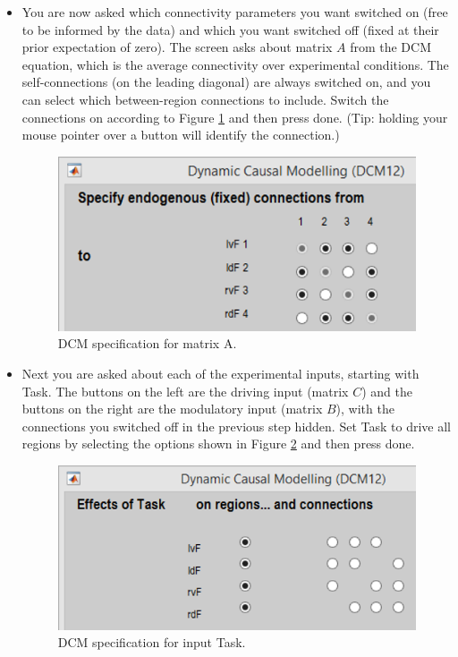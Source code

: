 \documentclass{article}
\begin{document}
\begin{itemize}
\item You are now asked which connectivity parameters you want switched on (free to be informed by the data) and which you want switched off (fixed at their prior expectation of zero). The screen asks about matrix \(A\) from the DCM equation, which is the average connectivity over experimental conditions. The self-connections (on the leading diagonal) are always switched on, and you can select which between-region connections to include. Switch the connections on according to Figure \ref{Fig_dcm_spec_A} and then press done. (Tip: holding your mouse pointer over a button will identify the connection.)

\begin{figure}[ht]
\begin{center}
\includegraphics{"Fig_dcm_spec_A"}
\caption{DCM specification for matrix A.\label{Fig_dcm_spec_A}}
\end{center}
\end{figure}

\item Next you are asked about each of the experimental inputs, starting with Task. The buttons on the left are the driving input (matrix \(C\)) and the buttons on the right are the modulatory input (matrix \(B\)), with the connections you switched off in the previous step hidden. Set Task to drive all regions by selecting the options shown in Figure \ref{Fig_dcm_spec_Task} and then press done.

\begin{figure}[ht]
\begin{center}
\includegraphics{"Fig_dcm_spec_Task"}
\caption{DCM specification for input Task.\label{Fig_dcm_spec_Task}}
\end{center}
\end{figure}


\end{itemize}
\end{document}
